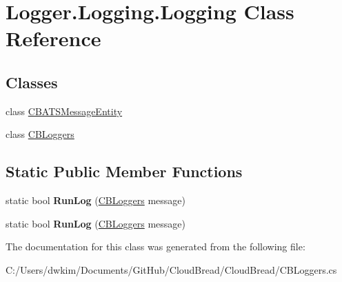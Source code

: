 \hypertarget{class_logger_1_1_logging_1_1_logging}{}\section{Logger.\+Logging.\+Logging Class Reference}
\label{class_logger_1_1_logging_1_1_logging}
\subsection*{Classes}
\begin{DoxyCompactItemize}
\item 
class \hyperlink{class_logger_1_1_logging_1_1_logging_1_1_c_b_a_t_s_message_entity}{C\+B\+A\+T\+S\+Message\+Entity}
\item 
class \hyperlink{class_logger_1_1_logging_1_1_logging_1_1_c_b_loggers}{C\+B\+Loggers}
\end{DoxyCompactItemize}
\subsection*{Static Public Member Functions}
\begin{DoxyCompactItemize}
\item 
static bool {\bfseries Run\+Log} (\hyperlink{class_logger_1_1_logging_1_1_logging_1_1_c_b_loggers}{C\+B\+Loggers} message)\hypertarget{class_logger_1_1_logging_1_1_logging_ab9ee47be781439bd81b8546287e6c48c}{}\label{class_logger_1_1_logging_1_1_logging_ab9ee47be781439bd81b8546287e6c48c}

\item 
static bool {\bfseries Run\+Log} (\hyperlink{class_logger_1_1_logging_1_1_logging_1_1_c_b_loggers}{C\+B\+Loggers} message)\hypertarget{class_logger_1_1_logging_1_1_logging_ab9ee47be781439bd81b8546287e6c48c}{}\label{class_logger_1_1_logging_1_1_logging_ab9ee47be781439bd81b8546287e6c48c}

\end{DoxyCompactItemize}


The documentation for this class was generated from the following file\+:\begin{DoxyCompactItemize}
\item 
C\+:/\+Users/dwkim/\+Documents/\+Git\+Hub/\+Cloud\+Bread/\+Cloud\+Bread/C\+B\+Loggers.\+cs\end{DoxyCompactItemize}
